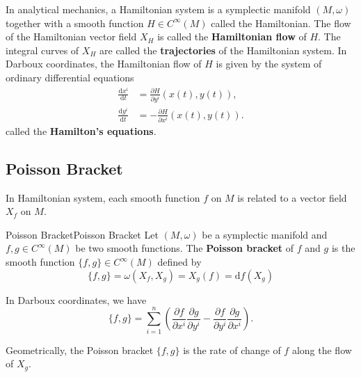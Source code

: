 \documentclass[../main.tex]{subfiles}
\begin{document}
In analytical mechanics, a Hamiltonian system is a symplectic manifold $(M, \omega)$ together with a smooth function $H \in C^\infty(M)$ called the Hamiltonian. The flow of the Hamiltonian vector field $X_H$ is called the \textbf{Hamiltonian flow} of $H$. The integral curves of $X_H$ are called the \textbf{trajectories} of the Hamiltonian system. In Darboux coordinates, the Hamiltonian flow of $H$ is given by the system of ordinary differential equations
\begin{equation}
  \begin{aligned}
    \frac{\mathrm{d} x^i}{\mathrm{d} t} &= \frac{\partial H}{\partial y^i}(x(t), y(t)), \\
    \frac{\mathrm{d} y^i}{\mathrm{d} t} &= -\frac{\partial H}{\partial x^i}(x(t), y(t)).
  \end{aligned}
\end{equation}
called the \textbf{Hamilton's equations}.

\subsection{Poisson Bracket}
In Hamiltonian system, each smooth function $f$ on $M$ is related to a vector field $X_f$ on $M$.

\begin{definition}{Poisson Bracket}{Poisson Bracket}
  Let $(M, \omega)$ be a symplectic manifold and $f, g \in C^\infty(M)$ be two smooth functions. The \textbf{Poisson bracket} of $f$ and $g$ is the smooth function $\{f, g\} \in C^\infty(M)$ defined by
  \begin{equation}
    \{f, g\} = \omega(X_f, X_g) = X_g(f) = \mathrm{d} f(X_g)
  \end{equation}
\end{definition}
In Darboux coordinates, we have
\begin{equation}
  \{f, g\} = \sum_{i=1}^n \left( \frac{\partial f}{\partial x^i} \frac{\partial g}{\partial y^i} - \frac{\partial f}{\partial y^i} \frac{\partial g}{\partial x^i} \right).
\end{equation}

\begin{remark}
  Geometrically, the Poisson bracket $\{f, g\}$ is the rate of change of $f$ along the flow of $X_g$.
\end{remark}
\end{document}
